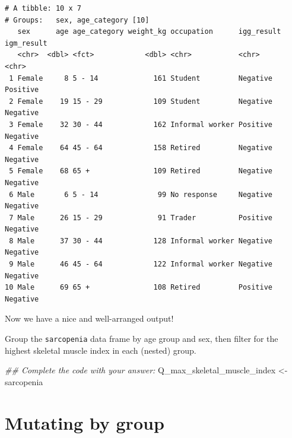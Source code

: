 \documentclass[
  letterpaper,
  DIV=11,
  numbers=noendperiod]{scrreprt}
\newenvironment{Shaded}{\begin{snugshade}}{\end{snugshade}}
\newcommand{\DocumentationTok}[1]{\textcolor[rgb]{0.37,0.37,0.37}{\textit{#1}}}
\newcommand{\NormalTok}[1]{\textcolor[rgb]{0.00,0.23,0.31}{#1}}
\newcommand{\OtherTok}[1]{\textcolor[rgb]{0.00,0.23,0.31}{#1}}
\begin{document}
\begin{verbatim}
# A tibble: 10 x 7
# Groups:   sex, age_category [10]
   sex      age age_category weight_kg occupation      igg_result igm_result
   <chr>  <dbl> <fct>            <dbl> <chr>           <chr>      <chr>     
 1 Female     8 5 - 14             161 Student         Negative   Positive  
 2 Female    19 15 - 29            109 Student         Negative   Negative  
 3 Female    32 30 - 44            162 Informal worker Positive   Negative  
 4 Female    64 45 - 64            158 Retired         Negative   Negative  
 5 Female    68 65 +               109 Retired         Negative   Negative  
 6 Male       6 5 - 14              99 No response     Negative   Negative  
 7 Male      26 15 - 29             91 Trader          Positive   Negative  
 8 Male      37 30 - 44            128 Informal worker Negative   Negative  
 9 Male      46 45 - 64            122 Informal worker Negative   Negative  
10 Male      69 65 +               108 Retired         Positive   Negative  
\end{verbatim}

Now we have a nice and well-arranged output!

\begin{tcolorbox}[enhanced jigsaw, titlerule=0mm, colback=white, left=2mm, breakable, opacitybacktitle=0.6, colbacktitle=quarto-callout-tip-color!10!white, colframe=quarto-callout-tip-color-frame, bottomtitle=1mm, opacityback=0, coltitle=black, arc=.35mm, toptitle=1mm, title=\textcolor{quarto-callout-tip-color}{\faLightbulb}\hspace{0.5em}{Practice}, leftrule=.75mm, toprule=.15mm, bottomrule=.15mm, rightrule=.15mm]

Group the \texttt{sarcopenia} data frame by age group and sex, then
filter for the highest skeletal muscle index in each (nested) group.

\begin{Shaded}
\begin{Highlighting}[]
\DocumentationTok{\#\# Complete the code with your answer:}
\NormalTok{Q\_max\_skeletal\_muscle\_index }\OtherTok{\textless{}{-}} 
\NormalTok{  sarcopenia }
\end{Highlighting}
\end{Shaded}

\end{tcolorbox}

\section{Mutating by group}\label{mutating-by-group}
\end{document}
